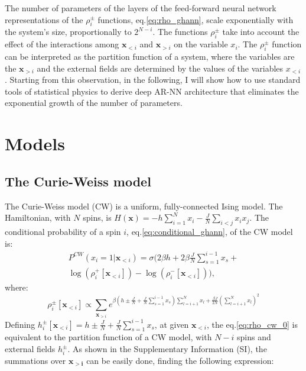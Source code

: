 \documentclass[aps,physrev,10pt,floatfix,reprint]{revtex4-2}
\begin{document}
The number of parameters of the layers of the feed-forward neural network representations of the $\rho_i^{\pm}$ functions, eq.\ref{eq:rho_ghann}, scale exponentially with the system's size, proportionally to $2^{N-i}$. 
The functions $\rho_i^{\pm}$ take into account the effect of the interactions among $\mathbf{x}_{<i}$ and $\mathbf{x}_{>i}$ on the variable $x_i$. 
The $\rho_i^{\pm}$ function can be interpreted as the partition function of a system, where the variables are the $\mathbf{x}_{>i}$ and the external fields are determined by the values of the variables $x_{<i}$.
Starting from this observation, in the following, I will show how to use standard tools of statistical physics to derive deep AR-NN architecture that eliminates the exponential growth of the number of parameters.  \\

\section{Models}
\subsection{The Curie-Weiss model}

The Curie-Weiss model (CW) is a uniform, fully-connected Ising model. The Hamiltonian, with $N$ spins, is $H\left(\mathbf{x}\right)=-h\sum_{i=1}^{N}x_{i}-\frac{J}{N}\sum_{i<j}x_{i}x_{j}$. The conditional probability of a spin $i$, eq.\ref{eq:conditional_ghann}, of the CW model is:
\begin{multline}
P^{CW}\left(x_{i}=1|\mathbf{x}_{<i}\right) = 
\sigma\bigg( 
 2 \beta h + 2 \beta \frac{J}{N}\sum_{s=1}^{i-1}x_{s} + \\
 \log(\rho_i^+[\mathbf{x}_{<i}]) - \log(\rho_i^-[\mathbf{x}_{<i}])
\bigg),
\label{eq:conditional_cw}
\end{multline}
where:
\begin{equation}
\rho_i^{\pm}[\mathbf{x}_{<i}] \propto \sum_{\mathbf{x}_{>i}}e^{\beta \left(h\pm\frac{J}{N}+\frac{J}{N}\sum_{s=1}^{i-1}x_{s}\right)\sum_{l=i+1}^{N}x_{l}+\frac{\beta J}{2N}(\sum_{l=i+1}^{N}x_{l})^{2}} 
\label{eq:rho_cw_0}
\end{equation}
Defining $h_i^{\pm}[\mathbf{x}_{<i}] =h\pm\frac{J}{N}+\frac{J}{N}\sum_{s=1}^{i-1}x_{s}$, at given $\mathbf{x}_{<i}$, the eq.\ref{eq:rho_cw_0} is equivalent to the partition function of a CW model, with $N-i$ spins and external fields $h_i^{\pm}$. 
As shown in the Supplementary Information (SI), the summations over $\mathbf{x_{>i}}$ can be easily done, finding the following expression:
\end{document}
